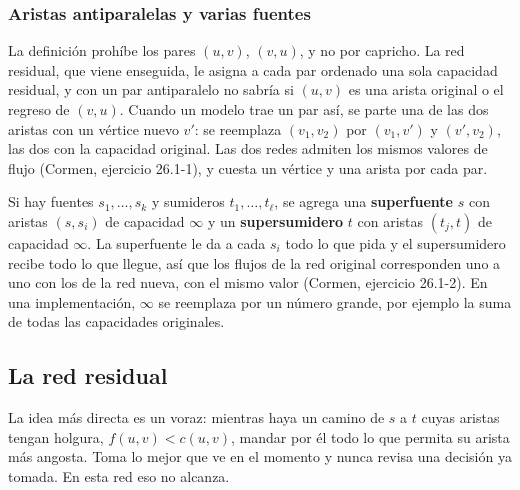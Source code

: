 \documentclass[11pt,letterpaper]{article}
\begin{document}
\subsubsection*{Aristas antiparalelas y varias fuentes}

La definición prohíbe los pares $(u, v)$, $(v, u)$, y no por capricho.
La red residual, que viene enseguida, le asigna a cada par ordenado
una sola capacidad residual, y con un par antiparalelo no sabría si
$(u, v)$ es una arista original o el regreso de $(v, u)$. Cuando un
modelo trae un par así, se parte una de las dos aristas con un vértice
nuevo $v'$: se reemplaza $(v_1, v_2)$ por $(v_1, v')$ y $(v', v_2)$,
las dos con la capacidad original. Las dos redes admiten los mismos
valores de flujo (Cormen, ejercicio 26.1-1), y cuesta un vértice y
una arista por cada par.

Si hay fuentes $s_1, \dots, s_k$ y sumideros $t_1, \dots, t_\ell$, se
agrega una \textbf{superfuente} $s$ con aristas $(s, s_i)$ de
capacidad $\infty$ y un \textbf{supersumidero} $t$ con aristas
$(t_j, t)$ de capacidad $\infty$. La superfuente le da a cada $s_i$
todo lo que pida y el supersumidero recibe todo lo que llegue, así que
los flujos de la red original corresponden uno a uno con los de la red
nueva, con el mismo valor (Cormen, ejercicio 26.1-2). En una
implementación, $\infty$ se reemplaza por un número grande, por
ejemplo la suma de todas las capacidades originales.


\subsection*{La red residual}

La idea más directa es un voraz: mientras haya un camino de $s$ a $t$
cuyas aristas tengan holgura, $f(u, v) < c(u, v)$, mandar por él todo
lo que permita su arista más angosta. Toma lo mejor que ve en el
momento y nunca revisa una decisión ya tomada. En esta red eso no
alcanza.
\end{document}

